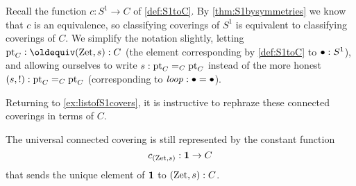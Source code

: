  Recall the function $c:S^1\to C$ of \cref{def:S1toC}.  By \cref{thm:S1bysymmetries} we know that $c$ is an equivalence, so classifying coverings of $S^1$ is equivalent to classifying coverings of $C$.  
We simplify the notation slightly, letting $\pt_C\defequi(\zet,s):C$ (the element corresponding by \cref{def:S1toC} to $\bullet:S^1$), and allowing ourselves to write $s:{\mathord{\mathrm{pt}}}_C=_C{\mathord{\mathrm{pt}}}_C$ instead of the more honest $(s,!):{\mathord{\mathrm{pt}}}_C=_C{\mathord{\mathrm{pt}}}_C$ (corresponding to $\mathit{loop}:\bullet=\bullet$).

 Returning to \cref{ex:listofS1covers}, it is instructive to rephraze these connected coverings in terms of $C$.
\begin{example}
 \label{ex:listofCcovers}\label{ex:Cunivcov}
The universal connected covering is still represented by the constant function
    $$c_{(\mathrm{Zet},s)}:\mathbf{1}\to C$$ that sends the unique element of $\mathbf{1}$ to $(\mathrm{Zet},s):C$.
    \end{example}
